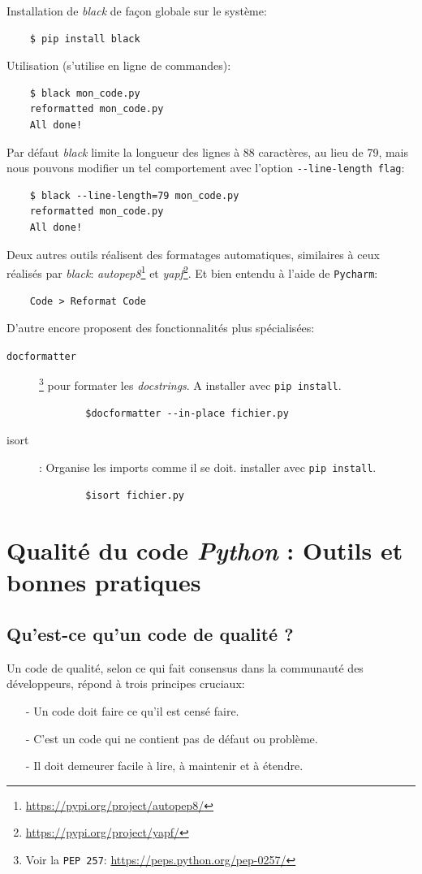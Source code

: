 \documentclass[a4paper,11pt]{book}
\begin{document}
Installation de \textit{black} de façon globale sur le système:
\begin{verbatim}
    $ pip install black
\end{verbatim}
\medskip

Utilisation (s'utilise en ligne de commandes):
\begin{verbatim}
    $ black mon_code.py
    reformatted mon_code.py
    All done!
\end{verbatim}
\medskip


Par défaut \textit{black} limite la longueur des lignes à 88 caractères, au lieu de 79, mais nous pouvons modifier un tel comportement avec l'option \verb|--line-length flag|:
\begin{verbatim}
    $ black --line-length=79 mon_code.py
    reformatted mon_code.py
    All done!
\end{verbatim}
\medskip

Deux autres outils réalisent des formatages automatiques, similaires à ceux réalisés par \textit{black}: \textit{autopep8}\footnote{\url{https://pypi.org/project/autopep8/}} et \textit{yapf}\footnote{\url{https://pypi.org/project/yapf/}}. Et bien entendu à l'aide de \texttt{Pycharm}:
\begin{verbatim}
    Code > Reformat Code
\end{verbatim}

D'autre encore proposent des fonctionnalités plus spécialisées:
\begin{description}
	\item[\texttt{docformatter}]\footnote{Voir la \texttt{PEP 257}: \url{https://peps.python.org/pep-0257/}} pour formater les \textit{docstrings}. A installer avec \texttt{pip install}.
	\begin{verbatim}
	    $docformatter --in-place fichier.py
	\end{verbatim}
	\item[isort]: Organise les imports comme il se doit.  installer avec \texttt{pip install}.
	\begin{verbatim}
	    $isort fichier.py
	\end{verbatim}
\end{description}
\medskip

\chapter{Qualité du code \textit{Python} : Outils et bonnes pratiques}
\section{Qu’est-ce qu’un code de qualité ?}
Un code de qualité, selon ce qui fait consensus dans la communauté des développeurs, répond à trois principes cruciaux:
\begin{itemize}
	\item[-] Un code doit faire ce qu’il est censé faire.
	\item[-] C'est un code qui ne contient pas de défaut ou problème.
	\item[-] Il doit demeurer facile à lire, à maintenir et à étendre.
\end{itemize}
\medskip
\end{document}
